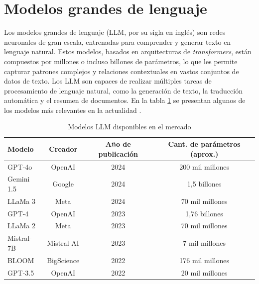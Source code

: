 \section{Modelos grandes de lenguaje}

Los modelos grandes de lenguaje (LLM, por su sigla en inglés) son redes neuronales de gran escala, entrenadas 
para comprender y generar texto en lenguaje natural. Estos modelos, basados en arquitecturas de \textit{transformers}, 
están compuestos por millones o incluso billones de parámetros, lo que les permite capturar patrones complejos y 
relaciones contextuales en vastos conjuntos de datos de texto. Los LLM son capaces de realizar múltiples 
tareas de procesamiento de lenguaje natural, como la generación de texto, la traducción 
automática y el resumen de documentos. En la tabla \ref{tab:llms} se presentan 
algunos de los modelos más relevantes en la actualidad \citep{website:lifearchitect}.

\vspace{5mm}

\begin{table}[h]
	\centering
	\caption[Modelos LLM disponibles en el mercado]{Modelos LLM disponibles en el mercado}
	\begin{tabular}{l c c c}    
		\toprule
		\textbf{Modelo} 	 & \textbf{Creador} 	& \textbf{Año de publicación}  & \textbf{Cant. de parámetros (aprox.)}\\
		\midrule
		GPT-4o               & OpenAI 				& 2024                         & 200 mil millones\\		
		Gemini 1.5      	 & Google				& 2024                         & 1,5 billones\\
		LLaMa 3         	 & Meta				    & 2024                         & 70 mil millones\\
        GPT-4         	     & OpenAI				& 2023                         & 1,76 billones\\
        LLaMa 2         	 & Meta				    & 2023                         & 70 mil millones\\
        Mistral-7B         	 & Mistral AI		    & 2023                         & 7 mil millones\\
        BLOOM         	     & BigScience		    & 2022                         & 176 mil millones\\
        GPT-3.5         	 & OpenAI				& 2022                         & 20 mil millones\\
		\bottomrule
		\hline
	\end{tabular}
	\label{tab:llms}
\end{table}

